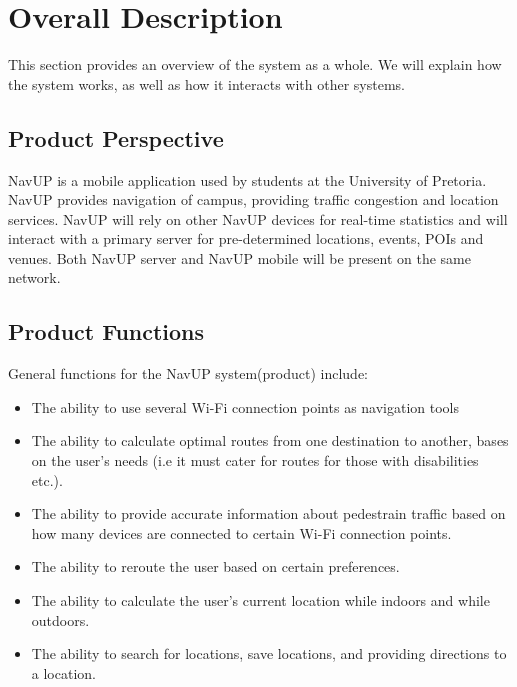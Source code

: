 ﻿\documentclass{article}
\begin{document}
\section{Overall Description}

    \begin{flushleft}
        This section provides an overview of the system as a whole. We will explain how the system works, as well as how it interacts with other systems.
    \end{flushleft}
    
    
    \subsection{Product Perspective}
    
        NavUP is a mobile application used by students at the University of Pretoria. NavUP provides navigation of campus, providing traffic congestion and location services. NavUP will rely on other NavUP devices for real-time statistics and will interact with a primary server for pre-determined locations, events, POIs and venues. Both NavUP server and NavUP mobile will be present on the same network.
    \subsection{Product Functions}
		\begin{flushleft}
			General functions for the NavUP system(product) include:
			\begin{itemize}
   		 	\item The ability to use several Wi-Fi connection points as navigation tools
			 	\item The ability to calculate optimal routes from one destination to another, bases on the user's needs (i.e it must cater for routes for those with disabilities etc.).
			 	\item The ability to provide accurate information about pedestrain traffic based on how many devices are connected to certain Wi-Fi connection points.
				 \item The ability to reroute the user based on certain preferences.
				 \item The ability to calculate the user's current location while indoors and while outdoors.
				 \item The ability to search for locations, save locations, and providing directions to a location. 
			\end{itemize}
		\end{flushleft}
\end{document}
